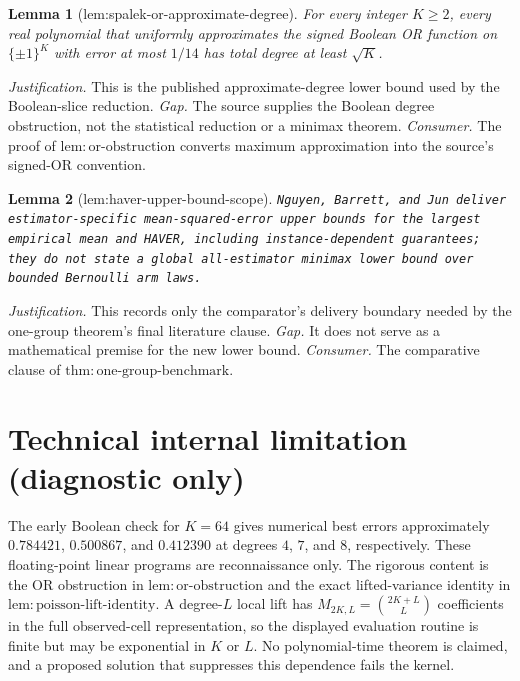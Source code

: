 \documentclass{article}
\newtheorem{lemma}{Lemma}
\begin{document}
\begin{lemma}[lem:spalek-or-approximate-degree]\label{lem:spalek-or-approximate-degree}
For every integer \(K\geq2\), every real polynomial that uniformly approximates the signed Boolean OR function on \(\{\pm1\}^K\) with error at most \(1/14\) has total degree at least \(\sqrt K\).
\end{lemma}
\par\smallskip\noindent \textit{Justification.} This is the published approximate-degree lower bound used by the Boolean-slice reduction. \textit{Gap.} The source supplies the Boolean degree obstruction, not the statistical reduction or a minimax theorem. \textit{Consumer.} The proof of \(\mathrm{lem{:}or\text{-}obstruction}\) converts maximum approximation into the source's signed-OR convention.

\begin{lemma}[lem:haver-upper-bound-scope]\label{lem:haver-upper-bound-scope}
\texttt{Nguyen,\allowbreak{} Barrett,\allowbreak{} and Jun deliver estimator-\allowbreak{}specific mean-\allowbreak{}squared-\allowbreak{}error upper bounds for the largest empirical mean and HAVER,\allowbreak{} including instance-\allowbreak{}dependent guarantees;\allowbreak{} they do not state a global all-\allowbreak{}estimator minimax lower bound over bounded Bernoulli arm laws.}
\end{lemma}
\par\smallskip\noindent \textit{Justification.} This records only the comparator's delivery boundary needed by the one-group theorem's final literature clause. \textit{Gap.} It does not serve as a mathematical premise for the new lower bound. \textit{Consumer.} The comparative clause of \(\mathrm{thm{:}one\text{-}group\text{-}benchmark}\).

\section*{Technical internal limitation (diagnostic only)}

The early Boolean check for \(K=64\) gives numerical best errors approximately \(0.784421\), \(0.500867\), and \(0.412390\) at degrees \(4\), \(7\), and \(8\), respectively. These floating-point linear programs are reconnaissance only. The rigorous content is the OR obstruction in \(\mathrm{lem{:}or\text{-}obstruction}\) and the exact lifted-variance identity in \(\mathrm{lem{:}poisson\text{-}lift\text{-}identity}\). A degree-\(L\) local lift has \(M_{2K,L}=\binom{2K+L}{L}\) coefficients in the full observed-cell representation, so the displayed evaluation routine is finite but may be exponential in \(K\) or \(L\). No polynomial-time theorem is claimed, and a proposed solution that suppresses this dependence fails the kernel.
\end{document}
